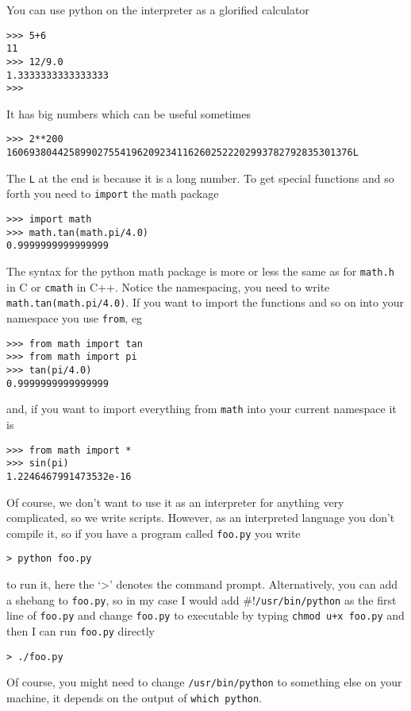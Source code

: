 \documentclass[11pt,a4paper]{scrartcl}
\begin{document}
You can use python on the interpreter as a glorified calculator
\begin{lstlisting}[numbers=right]
>>> 5+6
11
>>> 12/9.0
1.3333333333333333
>>> 
\end{lstlisting}
It has big numbers which can be useful sometimes
\begin{lstlisting}[numbers=right]
>>> 2**200
1606938044258990275541962092341162602522202993782792835301376L
\end{lstlisting}
The \texttt{L} at the end is because it is a long number. To get
special functions and so forth you need to \texttt{import} the math
package
\begin{lstlisting}[numbers=right]
>>> import math
>>> math.tan(math.pi/4.0)
0.9999999999999999
\end{lstlisting}

The syntax for the python math package is more or less the same as for
\texttt{math.h} in C or \texttt{cmath} in C++. Notice the namespacing,
you need to write \texttt{math.tan(math.pi/4.0)}. If you want to
import the functions and so on into your namespace you use
\texttt{from}, eg
\begin{lstlisting}[numbers=right]
>>> from math import tan 
>>> from math import pi
>>> tan(pi/4.0)
0.9999999999999999
\end{lstlisting}
and, if you want to import everything from \texttt{math} into your current namespace it is 
\begin{lstlisting}[numbers=right]
>>> from math import *
>>> sin(pi)
1.2246467991473532e-16
\end{lstlisting}

Of course, we don't want to use it as an interpreter for anything very
complicated, so we write scripts. However, as an interpreted language
you don't compile it, so if you have a program called \texttt{foo.py}
you write
\begin{lstlisting}[numbers=right]
> python foo.py
\end{lstlisting}
to run it, here the \lq{}>\rq{} denotes the command
prompt. Alternatively, you can add a shebang to \texttt{foo.py}, so in
my case I would add \texttt{$\#!$/usr/bin/python} as the first line of
\texttt{foo.py} and change \texttt{foo.py} to executable by typing
\texttt{chmod u+x foo.py} and then I can run \texttt{foo.py} directly
\begin{lstlisting}[numbers=right]
> ./foo.py
\end{lstlisting}
Of course, you might need to change \texttt{/usr/bin/python} to
something else on your machine, it depends on the output of
\texttt{which python}.
\end{document}
